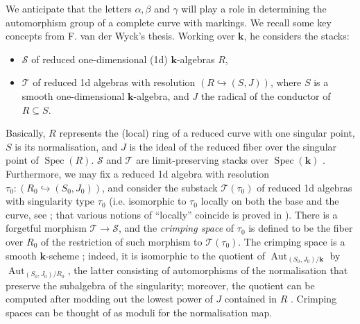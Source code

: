 \documentclass[11pt]{amsart}
\renewcommand{\k}{\mathbf k}
\renewcommand{\to}{\rightarrow}
\newcommand{\Aut}{\operatorname{Aut}}
\theoremstyle{plain}
\theoremstyle{definition}
\begin{document}
We anticipate that the letters $\alpha,\beta$ and $\gamma$ will play a role in determining the automorphism group of a complete curve with markings. We recall some key concepts from F. van der Wyck's thesis.
Working over $\k$, he considers the stacks:
\begin{itemize}[leftmargin=.5cm]
 \item $\mathcal S$ of reduced one-dimensional (1d) $\k$-algebras $R$,
 \item $\mathcal T$ of reduced 1d algebras with resolution $(R\hookrightarrow (S,J))$, where $S$ is a smooth one-dimensional $\k$-algebra, and $J$ the radical of the conductor of $R\subseteq S$.
\end{itemize}
  Basically, $R$ represents the (local) ring of a reduced curve with one singular point, $S$ is its normalisation, and $J$ is the ideal of the reduced fiber over the singular point of $\operatorname{Spec}(R)$. $\mathcal S$ and $\mathcal T$ are limit-preserving stacks over $\operatorname{Spec}(\k)$ \cite[Proposition 1.21]{vdW}. Furthermore, we may fix a reduced 1d algebra with resolution $\tau_0:(R_0\hookrightarrow(S_0,J_0))$, and consider the substack $\mathcal T(\tau_0)$ of reduced 1d algebras with singularity type $\tau_0$ (i.e. isomorphic to $\tau_0$ locally on both the base and the curve, see \cite[Definition 1.64]{vdW}; that various notions of ``locally'' coincide is proved in \cite[Proposition 1.50]{vdW}). There is a forgetful morphism $\mathcal T\to\mathcal S$, and the \emph{crimping space} of $\tau_0$ is defined to be the fiber over $R_0$ of the restriction of such morphism to $\mathcal T(\tau_0)$. The crimping space is a smooth $\k$-scheme \cite[Theorems 1.70 and 1.73]{vdW}; indeed, it is isomorphic to the quotient of $\Aut_{(S_0,J_0)/\k}$ by $\Aut_{(S_0,J_0)/R_0}$, the latter consisting of automorphisms of the normalisation that preserve the subalgebra of the singularity; moreover, the quotient can be computed after modding out the lowest power of $J$ contained in $R$ \cite[Theorem 1.53]{vdW}. Crimping spaces can be thought of as moduli for the normalisation map.
  
\end{document}
